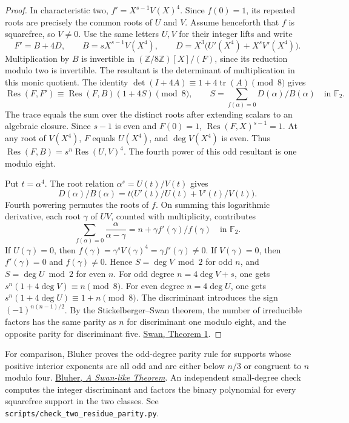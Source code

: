 \documentclass[11pt]{article}
\begin{document}
\begin{proof}
In characteristic two, \(f'=X^{s-1}V(X)^4\). Since \(f(0)=1\),
its repeated roots are precisely the common roots of \(U\) and \(V\).
Assume henceforth that \(f\) is squarefree, so \(V\ne0\). Use the
same letters \(U,V\) for their integer lifts and write
\[
 F'=B+4D,\qquad B=sX^{s-1}V(X^4),\qquad
 D=X^3\bigl(U'(X^4)+X^s V'(X^4)\bigr).
\]
Multiplication by \(B\) is invertible in
\((\mathbb Z/8\mathbb Z)[X]/(F)\), since its reduction modulo two
is invertible. The resultant is the determinant of multiplication
in this monic quotient. The identity
\(\det(I+4A)\equiv1+4\operatorname{tr}(A)\pmod8\) gives
\[
 \operatorname{Res}(F,F')\equiv\operatorname{Res}(F,B)(1+4S)
 \pmod8,\qquad
 S=\sum_{f(\alpha)=0}D(\alpha)/B(\alpha)\quad\text{in }\mathbb F_2 .
\]
The trace equals the sum over the distinct roots after extending
scalars to an algebraic closure. Since \(s-1\) is even and \(F(0)=1\),
\(\operatorname{Res}(F,X)^{s-1}=1\). At any root of \(V(X^4)\),
\(F\) equals \(U(X^4)\), and \(\deg V(X^4)\) is even. Thus
\(\operatorname{Res}(F,B)=s^n\operatorname{Res}(U,V)^4\).
The fourth power of this odd resultant is one modulo eight.

Put \(t=\alpha^4\). The root relation
\(\alpha^s=U(t)/V(t)\) gives
\[
 D(\alpha)/B(\alpha)=t\bigl(U'(t)/U(t)+V'(t)/V(t)\bigr).
\]
Fourth powering permutes the roots of \(f\). On summing this
logarithmic derivative, each root \(\gamma\) of \(UV\), counted
with multiplicity, contributes
\[
 \sum_{f(\alpha)=0}\frac{\alpha}{\alpha-\gamma}
      = n+\gamma f'(\gamma)/f(\gamma)\quad\text{in }\mathbb F_2 .
\]
If \(U(\gamma)=0\), then
\(f(\gamma)=\gamma^s V(\gamma)^4=\gamma f'(\gamma)\ne0\).
If \(V(\gamma)=0\), then \(f'(\gamma)=0\) and \(f(\gamma)\ne0\).
Hence \(S=\deg V\bmod 2\) for odd \(n\), and \(S=\deg U\bmod 2\)
for even \(n\). For odd degree \(n=4\deg V+s\), one gets
\(s^n(1+4\deg V)\equiv n\pmod8\). For even degree \(n=4\deg U\),
one gets \(s^n(1+4\deg U)\equiv1+n\pmod8\).
The discriminant introduces the sign \((-1)^{n(n-1)/2}\).
By the Stickelberger--Swan theorem, the number of irreducible factors
has the same parity as \(n\) for discriminant one modulo eight,
and the opposite parity for discriminant five.
\href{https://doi.org/10.2140/pjm.1962.12.1099}{Swan, Theorem 1}.
\end{proof}

For comparison, Bluher proves the odd-degree parity rule for supports
whose positive interior exponents are all odd and are either below
\(n/3\) or congruent to \(n\) modulo four.
\href{https://arxiv.org/abs/math/0406538}{Bluher, \emph{A Swan-like Theorem}}.
An independent small-degree check computes the integer discriminant
and factors the binary polynomial for every squarefree support in
the two classes. See \nolinkurl{scripts/check_two_residue_parity.py}.
\end{document}
